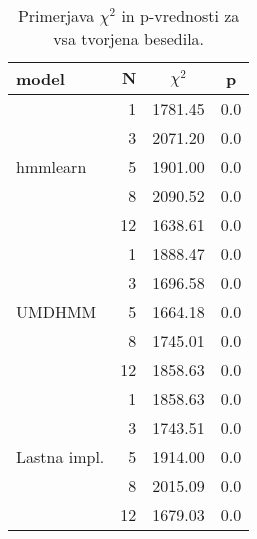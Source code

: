 \begin{table}
\centering
\begin{tabular}{l r cc}
\toprule
{\bf model}  & $\mathbf{N}$ & {\bf $\chi^2$} & \bf{p} \\
  \midrule\multirow{5}{*}{hmmlearn} %
    &  1              & 1781.45        & 0.0 \\
    &  3              & 2071.20        & 0.0 \\
    &  5              & 1901.00        & 0.0 \\
    &  8              & 2090.52        & 0.0 \\
    & 12              & 1638.61        & 0.0 \\
  \midrule\multirow{5}{*}{UMDHMM} %
    &  1              & 1888.47        & 0.0 \\
    &  3              & 1696.58        & 0.0 \\
    &  5              & 1664.18        & 0.0 \\
    &  8              & 1745.01        & 0.0 \\
    & 12              & 1858.63        & 0.0 \\
  \midrule\multirow{5}{*}{Lastna impl.} %
    &  1              & 1858.63        & 0.0 \\
    &  3              & 1743.51        & 0.0 \\
    &  5              & 1914.00        & 0.0 \\
    &  8              & 2015.09        & 0.0 \\
    & 12              & 1679.03        & 0.0 \\
\bottomrule
\end{tabular} \\
\vspace{6pt}{\centering N \dots št. skritih stanj modela}
\caption{Primerjava $\chi^2$ in p-vrednosti za vsa tvorjena besedila.}
\label{tab:bench:models_vs_corpus}
\end{table}
